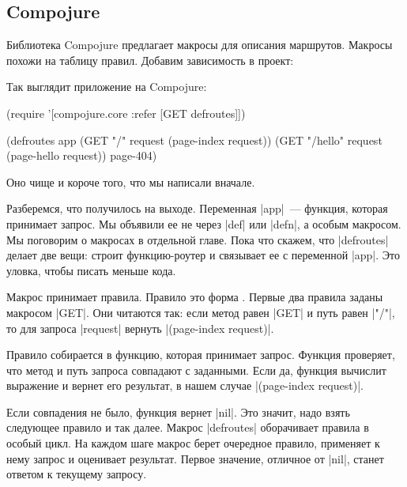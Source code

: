 \subsection{Compojure}

\label{compojure}

Библиотека Compojure
предлагает макросы для описания маршрутов. Макросы похожи на таблицу правил.
Добавим зависимость в проект:

\begin{english}
  \begin{clojure}
[compojure "1.6.1"]
  \end{clojure}
\end{english}

\noindent
Так выглядит приложение на Compojure:

\begin{english}
  \begin{clojure}
(require '[compojure.core :refer [GET defroutes]])

(defroutes app
  (GET "/"      request (page-index request))
  (GET "/hello" request (page-hello request))
  page-404)
  \end{clojure}
\end{english}

\noindent
Оно чище и короче того, что мы написали вначале.

Разберемся, что получилось на выходе. Переменная \spverb|app|~--- функция,
которая принимает запрос. Мы объявили ее не через \spverb|def| или
\spverb|defn|, а особым макросом. Мы поговорим о макросах в отдельной
главе. Пока что скажем, что \spverb|defroutes| делает две вещи: строит
функцию-роутер и связывает ее с переменной \spverb|app|. Это уловка, чтобы
писать меньше кода.

Макрос принимает правила. Правило это форма .
Первые два правила заданы макросом \spverb|GET|. Они читаются так:
если метод равен \spverb|GET| и путь равен \spverb|"/"|, то для запроса
\spverb|request| вернуть \spverb|(page-index request)|.

Правило собирается в функцию, которая принимает запрос. Функция проверяет, что
метод и путь запроса совпадают с заданными. Если да, функция вычислит выражение
и вернет его результат, в нашем случае \spverb|(page-index request)|.

Если совпадения не было, функция вернет \spverb|nil|. Это значит, надо взять
следующее правило и так далее. Макрос \spverb|defroutes| оборачивает правила в
особый цикл. На каждом шаге макрос берет очередное правило, применяет к нему
запрос и оценивает результат. Первое значение, отличное от \spverb|nil|, станет
ответом к текущему запросу.

